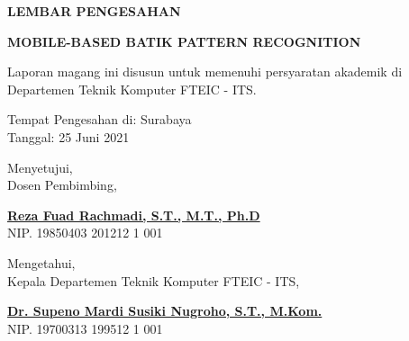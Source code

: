 \begin{center}
  {\Large \textbf{LEMBAR PENGESAHAN}}
  \vspace{6ex}


  {\large \textbf{MOBILE-BASED BATIK PATTERN RECOGNITION}}
  \vspace{6ex}

  Laporan magang ini disusun untuk memenuhi persyaratan akademik di Departemen Teknik Komputer FTEIC - ITS.
  \vspace{2ex}

  Tempat Pengesahan di: Surabaya \\
  Tanggal: 25 Juni 2021
  \vspace{8ex}

  Menyetujui, \\
  Dosen Pembimbing,
  \vspace{12ex}

  \textbf{\underline{Reza Fuad Rachmadi, S.T., M.T., Ph.D}} \\
  NIP. 19850403 201212 1 001
  \vspace{8ex}

  Mengetahui, \\
  Kepala Departemen Teknik Komputer FTEIC - ITS,
  \vspace{12ex}

  \textbf{\underline{Dr. Supeno Mardi Susiki Nugroho, S.T., M.Kom.}} \\
  NIP. 19700313 199512 1 001

\end{center}